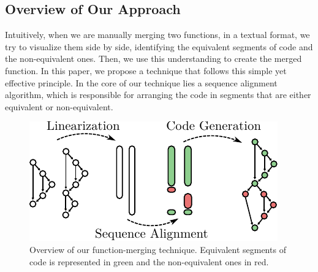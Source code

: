 \subsection{Overview of Our Approach}
Intuitively, when we are manually merging two functions, in a textual format, we try to visualize them side by side, identifying the
equivalent segments of code and the non-equivalent ones. Then, we use this understanding to create the merged function. In this paper, we
propose a technique that follows this simple yet effective principle. In the core of our technique lies a sequence alignment algorithm,
which is responsible for arranging the code in segments that are either equivalent or non-equivalent.

\begin{figure}[t!]
  \centering
  \includegraphics[width=0.85\linewidth]{figs/func-merge-overview.pdf}
  \caption{Overview of our function-merging technique.
           Equivalent segments of code is represented in green and the non-equivalent ones in red.}

  \label{fig:func-merge-overview}
\end{figure}

